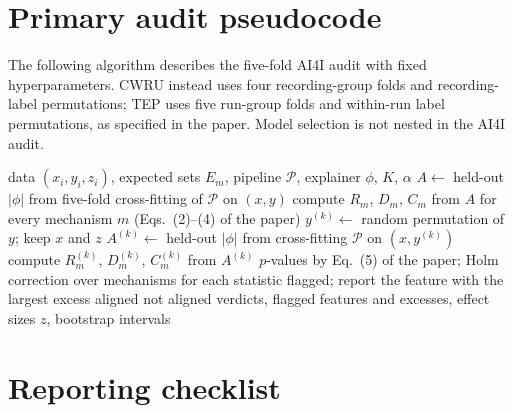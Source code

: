 \documentclass[10pt]{article}
\begin{document}
\section{Primary audit pseudocode}

The following algorithm describes the five-fold AI4I audit with fixed hyperparameters. CWRU instead uses four recording-group folds and recording-label permutations; TEP uses five run-group folds and within-run label permutations, as specified in the paper. Model selection is not nested in the AI4I audit.

\begin{algorithm}[H]
\caption{Mechanism-level attribution audit}
\label{alg:audit}
\small
\begin{algorithmic}[1]
\REQUIRE data $(x_i,y_i,z_i)$, expected sets $E_m$, pipeline $\mathcal{P}$, explainer $\phi$, $K$, $\alpha$
\STATE $A\leftarrow$ held-out $|\phi|$ from five-fold cross-fitting of $\mathcal{P}$ on $(x,y)$
\STATE compute $R_m$, $D_m$, $C_m$ from $A$ for every mechanism $m$ (Eqs.~(2)--(4) of the paper)
\STATE $y^{(k)}\leftarrow$ random permutation of $y$; keep $x$ and $z$
\STATE $A^{(k)}\leftarrow$ held-out $|\phi|$ from cross-fitting $\mathcal{P}$ on $(x,y^{(k)})$
\STATE compute $R_m^{(k)}$, $D_m^{(k)}$, $C_m^{(k)}$ from $A^{(k)}$
\ENDFOR
\STATE $p$-values by Eq.~(5) of the paper; Holm correction over mechanisms for each statistic
\STATE flagged; report the feature with the largest excess
\STATE aligned
\ELSE
\STATE not aligned
\ENDIF
\ENDFOR
\ENSURE verdicts, flagged features and excesses, effect sizes $z$, bootstrap intervals
\end{algorithmic}
\end{algorithm}

\section{Reporting checklist}
\end{document}
